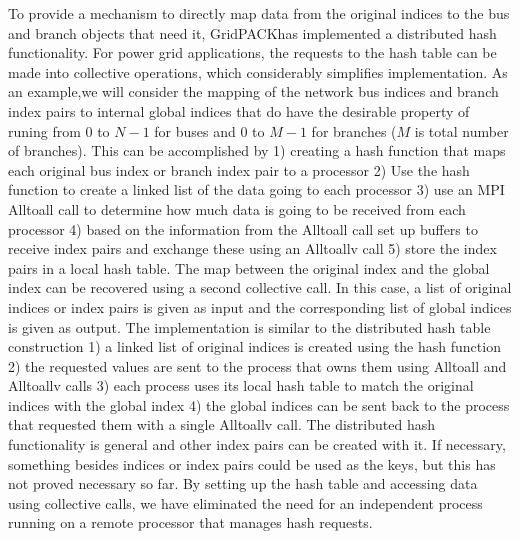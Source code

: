 \documentclass[preprint]{acm_proc_article-sp}
\begin{document}
To provide a mechanism to directly map data from the original indices to the bus
and branch objects that need it, GridPACK\texttrademark has implemented a
distributed hash
functionality. For power grid applications, the requests to the hash table can be
made into collective operations, which considerably simplifies implementation.
As an example,we will consider the mapping of the network bus
indices and branch index pairs to internal global indices that do have the
desirable property of runing from 0 to $N-1$ for buses and 0 to $M-1$ for
branches ($M$ is total number of branches). This can be accomplished by 1)
creating a hash function that maps each original bus index or branch index pair
to a processor 2) Use the hash function to create a linked list of the data
going to each processor 3) use an MPI Alltoall call to determine how much data
is going to be received from each processor 4) based on the information from the
Alltoall call set up buffers to receive index pairs and exchange these using an
Alltoallv call 5) store the index pairs in a local hash table. The map between
the original index and the global index can be recovered using a  second collective
call. In this case, a list of original indices or index pairs is given as input
and the corresponding list of global indices is given as output. The
implementation is similar to the distributed hash table construction 1) a linked
list of original indices is created using the hash function 2) the requested
values are sent to the process that owns them using Alltoall and Alltoallv calls
3) each process uses its local hash table to match the original indices with the
global index 4) the global indices can be sent back to the process that
requested them with a single Alltoallv call. The distributed hash functionality is
general and other index pairs can be created with it. If necessary, something
besides indices or index pairs could be used as the keys, but this has not
proved necessary so far. By setting up the hash table and accessing data using
collective calls, we have eliminated the need for an independent process running
on a remote processor that manages hash requests.
\end{document}

